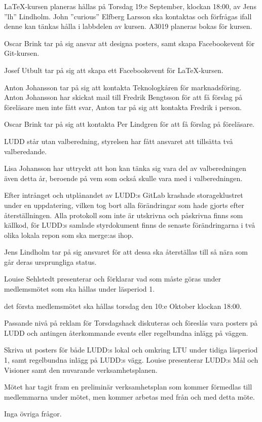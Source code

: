 \documentclass{protokoll}
\begin{document}
LaTeX-kursen planeras hållas på Torsdag 19:e September, klockan 18:00, av Jens
''lh'' Lindholm. John ''curious'' Elfberg Larsson ska kontaktas och förfrågas
ifall denne kan tänkas hålla i labbdelen av kursen. A3019 planeras bokas för
kursen. 


Oscar Brink tar på sig ansvar att designa posters, samt skapa Facebookevent för
Git-kursen. 


Josef Utbult tar på sig att skapa ett Facebookevent för LaTeX-kursen.


Anton Johansson tar på sig att kontakta Teknologkåren för marknadsföring.
Anton Johansson har skickat mail till Fredrik Bengtsson för att få förslag på
föreläsare men inte fått svar, Anton tar på sig att kontakta Fredrik i person.


Oscar Brink tar på sig att kontakta Per Lindgren för att få förslag på
föreläsare. 

LUDD står utan valberedning, styrelsen har fått ansvaret att tillsätta två
valberedande. 


Lisa Johansson har uttryckt att hon kan tänka sig vara del av valberedningen
även detta år, beroende på vem som också skulle vara med i valberedningen. 

Efter intrånget och utplånandet av LUDD:s GitLab krashade storageklustret under
en uppdatering, vilken tog bort alla förändringar som hade gjorts efter
återställningen. Alla protokoll som inte är utskrivna och påskrivna finns som
källkod, för LUDD:s samlade styrdokument finns de senaste förändringarna i två
olika lokala repon som ska merge:as ihop. 


Jens Lindholm tar på sig ansvaret för att dessa ska återställas till så nära
som går deras ursprungliga status. 

Louise Sehlstedt presenterar och förklarar vad som måste göras under
medlemsmötet som ska hållas under läsperiod 1. 

\begin{beslut}
  \att det första medlemsmötet ska hållas torsdag den 10:e Oktober klockan
  18:00.
\end{beslut}
Passande nivå på reklam för Torsdagshack diskuteras och föreslås vara posters 
på LUDD och antingen återkommande events eller regelbundna inlägg på väggen. 


Skriva ut posters för både LUDD:s lokal och omkring LTU under tidiga läsperiod
1, samt regelbundna inlägg på LUDD:s vägg. 
Louise presenterar LUDD:s Mål och Visioner samt den nuvarande verksamhetsplanen.  

Mötet har tagit fram en preliminär verksamhetsplan som kommer förmedlas till
medlemmarna under mötet, men kommer arbetas med från och med detta möte.

Inga övriga frågor.
\end{document}
